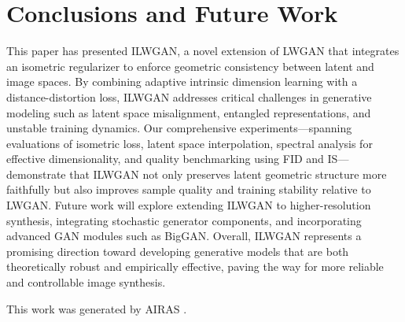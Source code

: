 \documentclass{article} %
\begin{document}
\section{Conclusions and Future Work}
\label{sec:conclusion}
This paper has presented ILWGAN, a novel extension of LWGAN that integrates an isometric regularizer to enforce geometric consistency between latent and image spaces. By combining adaptive intrinsic dimension learning with a distance-distortion loss, ILWGAN addresses critical challenges in generative modeling such as latent space misalignment, entangled representations, and unstable training dynamics. Our comprehensive experiments---spanning evaluations of isometric loss, latent space interpolation, spectral analysis for effective dimensionality, and quality benchmarking using FID and IS---demonstrate that ILWGAN not only preserves latent geometric structure more faithfully but also improves sample quality and training stability relative to LWGAN. Future work will explore extending ILWGAN to higher-resolution synthesis, integrating stochastic generator components, and incorporating advanced GAN modules such as BigGAN\citep{Chambolle2016}. Overall, ILWGAN represents a promising direction toward developing generative models that are both theoretically robust and empirically effective, paving the way for more reliable and controllable image synthesis.

This work was generated by \textsc{AIRAS} \citep{airas2025}.



\end{document}
